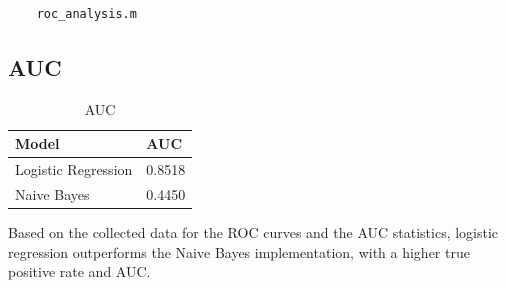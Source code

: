 \documentclass[12pt, letterpaper]{report}
\begin{document}
\begin{verbatim}
    roc_analysis.m
\end{verbatim}


\subsection{AUC}

\begin{figure}[H]
	\captionsetup[subfigure]{labelformat=empty}
	\centering
	\qquad
	\label{fig:example}
\end{figure}

\begin{table}[H]
	\centering
	\begin{tabular}{ |l|l| }
		\hline
		\textbf{Model} & \textbf{AUC} \\
		\hline
		Logistic Regression & 0.8518 \\
		\hline
		Naive Bayes & 0.4450 \\
		\hline
	\end{tabular}
	\caption{AUC}
\end{table}

Based on the collected data for the ROC curves and the AUC statistics, logistic regression outperforms the Naive Bayes implementation, with a higher true positive rate and AUC.
\end{document}
